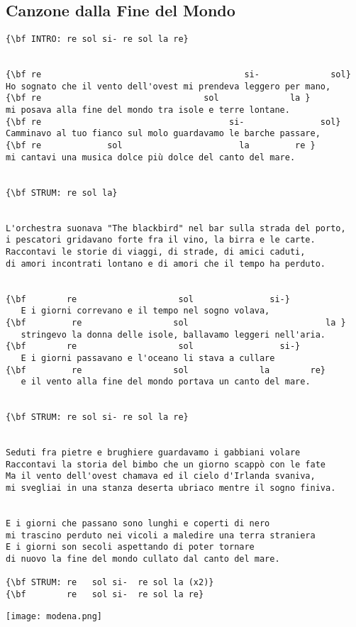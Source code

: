 \documentclass[a4paper]{article}
\begin{document}
\subsection{Canzone dalla Fine del Mondo} %
\label{sub:Canzone dalla Fine del Mo}
\begin{Verbatim}[commandchars=\\\{\}]
{\bf INTRO: re sol si- re sol la re}


{\bf re                                        si-              sol}
Ho sognato che il vento dell'ovest mi prendeva leggero per mano,
{\bf re                                sol              la }
mi posava alla fine del mondo tra isole e terre lontane.
{\bf re                                     si-               sol}
Camminavo al tuo fianco sul molo guardavamo le barche passare,
{\bf re             sol                       la         re }
mi cantavi una musica dolce più dolce del canto del mare. 


{\bf STRUM: re sol la}


L'orchestra suonava "The blackbird" nel bar sulla strada del porto, 
i pescatori gridavano forte fra il vino, la birra e le carte. 
Raccontavi le storie di viaggi, di strade, di amici caduti, 
di amori incontrati lontano e di amori che il tempo ha perduto. 


{\bf        re                    sol               si-}
   E i giorni correvano e il tempo nel sogno volava,
{\bf         re                  sol                           la }
   stringevo la donna delle isole, ballavamo leggeri nell'aria. 
{\bf        re                    sol                 si-}
   E i giorni passavano e l'oceano li stava a cullare
{\bf         re                  sol              la        re}
   e il vento alla fine del mondo portava un canto del mare. 


{\bf STRUM: re sol si- re sol la re}


Seduti fra pietre e brughiere guardavamo i gabbiani volare 
Raccontavi la storia del bimbo che un giorno scappò con le fate 
Ma il vento dell'ovest chamava ed il cielo d'Irlanda svaniva, 
mi svegliai in una stanza deserta ubriaco mentre il sogno finiva. 


E i giorni che passano sono lunghi e coperti di nero 
mi trascino perduto nei vicoli a maledire una terra straniera 
E i giorni son secoli aspettando di poter tornare 
di nuovo la fine del mondo cullato dal canto del mare.

{\bf STRUM: re   sol si-  re sol la (x2)}
{\bf        re   sol si-  re sol la re}
\end{Verbatim}
\newpage
\centerline{\texttt{[image: modena.png]}}
\newpage
\end{document}
